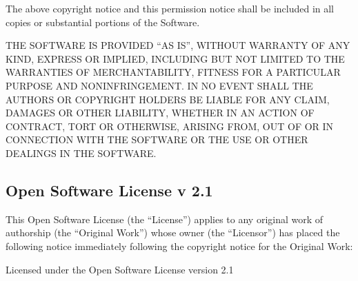 \documentclass[11pt]{book}
\begin{document}
The above copyright notice and this permission notice shall be included in all
copies or substantial portions of the Software.

\noindent
THE SOFTWARE IS PROVIDED ``AS IS'', WITHOUT WARRANTY OF ANY KIND, EXPRESS OR
IMPLIED, INCLUDING BUT NOT LIMITED TO THE WARRANTIES OF MERCHANTABILITY,
FITNESS FOR A PARTICULAR PURPOSE AND NONINFRINGEMENT. IN NO EVENT SHALL THE
AUTHORS OR COPYRIGHT HOLDERS BE LIABLE FOR ANY CLAIM, DAMAGES OR OTHER
LIABILITY, WHETHER IN AN ACTION OF CONTRACT, TORT OR OTHERWISE, ARISING FROM,
OUT OF OR IN CONNECTION WITH THE SOFTWARE OR THE USE OR OTHER DEALINGS IN THE
SOFTWARE.

\subsection{Open Software License v 2.1}

This Open Software License (the ``License'') applies to any original
work of authorship (the ``Original Work'') whose owner (the ``Licensor'')
has placed the following notice immediately following the copyright
notice for the Original Work:
\begin{center}
Licensed under the Open Software License version 2.1
\end{center}
\end{document}
